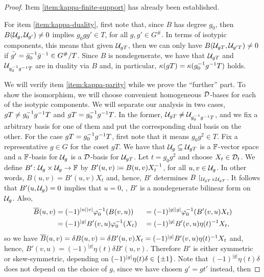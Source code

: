 \begin{proof}
    Item \eqref{item:kappa-finite-support} has already been established. 
    
    For item \eqref{item:kappa-duality}, first note that, since $B$ has degree $g_0$, then $B(\mathcal U_{g}, \mathcal U_{g'}) \neq 0$ implies $g_0 g g' \in T$, for all $g, g' \in G^\#$. 
    In terms of isotypic components, this means that given $\mathcal U_{g T}$, then we can only have $B(\mathcal U_{g T}, \mathcal U_{g' T}) \neq 0$ if $\bar {g'} = \bar g_0^{-1} \bar g^{-1} \in G^\#/T$. 
    Since $B$ is nondegenerate, we have that $\mathcal U_{g T}$ and $\mathcal U_{g_0^{-1} g^{-1} T}$ are in duality via $B$ and, in particular, $\kappa(g T) = \kappa(g_0^{-1} g ^{-1} T)$ holds. 
    
    We will verify item \eqref{item:kappa-parity} while we prove the ``further'' part. 
    To show the isomorphism, we will choose convenient homogeneous $\mathcal{D}$-bases for each of the isotypic components. 
    We will separate our analysis in two cases, $gT \neq g_0^{-1} g ^{-1} T$ and $gT = g_0^{-1} g ^{-1} T$. 
    In the former, $\mathcal U_{g T} \neq \mathcal U_{g_0^{-1} g^{-1} T}$, and we fix a arbitrary basis for one of them and put the corresponding dual basis on the other. 
    For the case $gT = g_0^{-1} g ^{-1} T$, first note that it means $g_0 g^2 \in T$. 
    Fix a representative $g\in G$ for the coset $gT$. 
    We have that $\mathcal U_g \subseteq \mathcal U_{gT}$ is a $\mathbb{F}$-vector space and a $\mathbb{F}$-basis for $\mathcal U_g$ is a $\mathcal{D}$-basis for $\mathcal U_{gT}$. 
    Let $t=g_0 g^2$ and choose $X_t \in \mathcal{D}_t$. 
    We define $B'\colon \mathcal U_g \times \mathcal U_g \to \mathbb{F}$ by $B'(u,v) \coloneqq B(u,v) X_t^{-1}$, for all $u, v \in \mathcal U_g$. 
    In other words, $B(u,v) = B'(u,v) X_t$ and, hence, $B'$ determines $B\restriction_{\mathcal U_{gT} \times \mathcal U_{gT}}$. 
    It follows that $B'(u, \mathcal U_g) = 0$ implies that $u=0$, \ie, $B'$ is a nondegenerate bilinear form on $\mathcal U_g$. 
    Also, 
    \begin{alignat*}{3}
        \overline{B} (u, v) &= (-1)^{|u||v|} \varphi_0^{-1}( B(v, u) )
        &&= (-1)^{|g||g|} \varphi_0^{-1}( B'(v, u)X_t )\\
        &= (-1)^{|g|} B'(v, u) \varphi_0^{-1}(X_t)
        &&= (-1)^{|g|} B'(v, u) \eta(t)^{-1} X_t,
    \end{alignat*}
    so we have $\overline{B} (u, v) = \delta B (u, v) = \delta B' (u,v) X_t = (-1)^{|g|} B'(v, u) \eta(t)^{-1} X_t$ and, hence, $B'(v, u) = (-1)^{|g|} \eta(t) \delta B'(u,v)$. 
    Therefore $B'$ is either symmetric or skew-symmetric, depending on $(-1)^{|g|} \eta(t) \delta \in \{ \pm 1 \}$. 
    Note that $(-1)^{|g|} \eta(t) \delta$ does not depend on the choice of $g$, since we have chosen $g' = gt'$ instead, then 

\end{proof}
